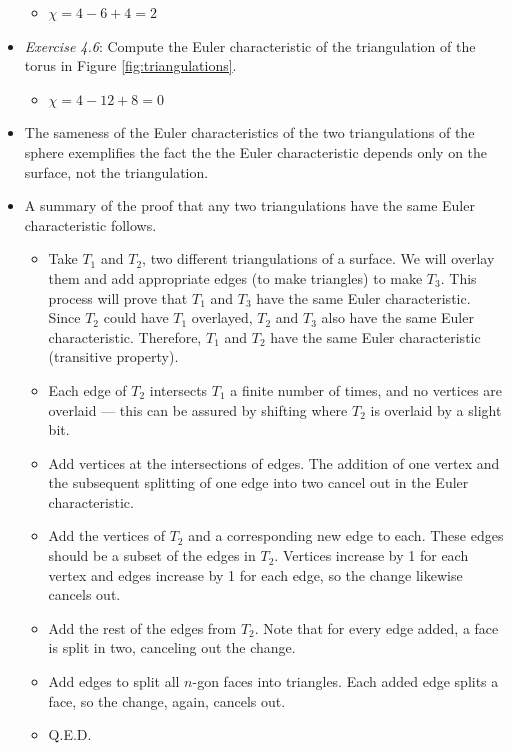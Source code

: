 \documentclass[titlepage]{article}
\numberwithin{figure}{section}
\numberwithin{table}{section}
\numberwithin{equation}{section}
\begin{document}
\begin{itemize}
    \begin{itemize}
        \item $\chi=4-6+4=2$
    \end{itemize}
    \item \emph{Exercise 4.6}: Compute the Euler characteristic of the triangulation of the torus in Figure \ref{fig:triangulations}.
    \begin{itemize}
        \item $\chi=4-12+8=0$
    \end{itemize}
    \item The sameness of the Euler characteristics of the two triangulations of the sphere exemplifies the fact the the Euler characteristic depends only on the surface, not the triangulation.
    \item A summary of the proof that any two triangulations have the same Euler characteristic follows.
    \begin{itemize}
        \item Take $T_1$ and $T_2$, two different triangulations of a surface. We will overlay them and add appropriate edges (to make triangles) to make $T_3$. This process will prove that $T_1$ and $T_3$ have the same Euler characteristic. Since $T_2$ could have $T_1$ overlayed, $T_2$ and $T_3$ also have the same Euler characteristic. Therefore, $T_1$ and $T_2$ have the same Euler characteristic (transitive property).
        \item Each edge of $T_2$ intersects $T_1$ a finite number of times, and no vertices are overlaid --- this can be assured by shifting where $T_2$ is overlaid by a slight bit.
        \item Add vertices at the intersections of edges. The addition of one vertex and the subsequent splitting of one edge into two cancel out in the Euler characteristic.
        \item Add the vertices of $T_2$ and a corresponding new edge to each. These edges should be a subset of the edges in $T_2$. Vertices increase by 1 for each vertex and edges increase by 1 for each edge, so the change likewise cancels out.
        \item Add the rest of the edges from $T_2$. Note that for every edge added, a face is split in two, canceling out the change.
        \item Add edges to split all $n$-gon faces into triangles. Each added edge splits a face, so the change, again, cancels out.
        \item Q.E.D.

\end{itemize}
\end{itemize}
\end{document}
